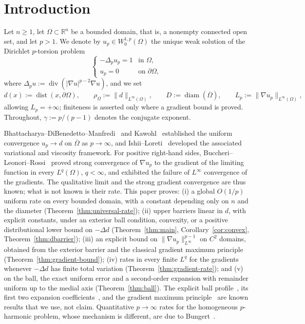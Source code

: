 \documentclass[11pt]{article}
\newcommand{\R}{\mathbb R}
\newcommand{\abs}[1]{\lvert #1\rvert}
\newcommand{\norm}[1]{\lVert #1\rVert}
\newcommand{\dist}{\operatorname{dist}}
\newcommand{\diam}{\operatorname{diam}}
\theoremstyle{definition}
\theoremstyle{remark}
\begin{document}
\section{Introduction}\label{sec:intro}
Let $n\ge1$, let $\Omega\subset\R^n$ be a bounded domain, that is, a nonempty
connected open set, and let $p>1$. We denote by $u_p\in W^{1,p}_0(\Omega)$
the unique weak solution of the Dirichlet $p$-torsion problem
\begin{equation}\label{eq:torsion}
\begin{cases}
-\Delta_p u_p = 1 & \text{in } \Omega,\\
u_p = 0 & \text{on } \partial\Omega,
\end{cases}
\end{equation}
where $\Delta_p u := \operatorname{div}(\abs{\nabla u}^{p-2}\nabla u)$, and we set
\[
d(x):=\dist(x,\partial\Omega),\qquad
\rho_\Omega:=\norm{d}_{L^\infty(\Omega)},\qquad
D:=\diam(\overline\Omega),\qquad
L_p:=\norm{\nabla u_p}_{L^\infty(\Omega)},
\]
allowing $L_p=+\infty$; finiteness is asserted only where a gradient bound is
proved. Throughout, $\gamma:=p/(p-1)$ denotes the conjugate exponent.

Bhattacharya--DiBenedetto--Manfredi~\cite{BDM} and Kawohl~\cite{Kaw}
established the uniform convergence $u_p\to d$ on $\overline\Omega$ as
$p\to\infty$, and Ishii--Loreti~\cite{IL} developed the associated variational
and viscosity framework. For positive right-hand sides,
Buccheri--Leonori--Rossi~\cite{BLR} proved strong convergence of $\nabla u_p$
to the gradient of the limiting function in every $L^q(\Omega)$, $q<\infty$,
and exhibited the failure of $L^\infty$ convergence of the gradients. The
qualitative limit and the strong gradient convergence are thus known; what is
not known is their rate. This paper proves: (i) a global $O(1/p)$ uniform rate
on every bounded domain, with a constant depending only on $n$ and the
diameter (Theorem~\ref{thm:universal-rate}); (ii) upper barriers linear in
$d$, with explicit constants, under an exterior ball condition, convexity, or
a positive distributional lower bound on $-\Delta d$
(Theorem~\ref{thm:main}, Corollary~\ref{cor:convex},
Theorem~\ref{thm:dbarrier}); (iii) an explicit bound on
$\norm{\nabla u_p}_{L^\infty}^{p-1}$ on $C^2$ domains, obtained from the
exterior barrier and the classical gradient maximum principle
(Theorem~\ref{thm:gradient-bound}); (iv) rates in every finite $L^q$ for the
gradients whenever $-\Delta d$ has finite total variation
(Theorem~\ref{thm:gradient-rate}); and (v) on the ball, the exact uniform
error and a second-order expansion with remainder uniform up to the medial
axis (Theorem~\ref{thm:ball}). The explicit ball profile~\cite{VdBB2014},
its first two expansion coefficients~\cite{FB2026}, and the gradient maximum
principle~\cite{PP,Sperb,Kaw1987} are known results that we use, not claim.
Quantitative $p\to\infty$ rates for the homogeneous $p$-harmonic problem, whose
mechanism is different, are due to Bungert~\cite{Bun}.
\end{document}
